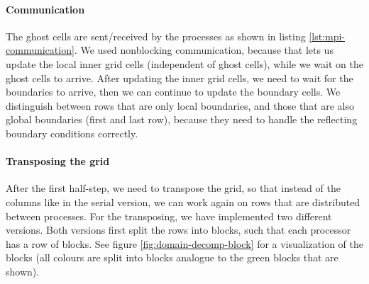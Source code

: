 \documentclass[a4paper]{article}
\begin{document}
\paragraph{Communication}
The ghost cells are sent/received by the processes as shown in listing \ref{lst:mpi-communication}.
We used nonblocking communication, because that lets us update the local inner grid cells (independent of ghost cells), while we wait on the ghost cells to arrive.
After updating the inner grid cells, we need to wait for the boundaries to arrive, then we can continue to update the boundary cells.
We distinguish between rows that are only local boundaries, and those that are also global boundaries (first and last row), because they need to handle the reflecting boundary conditions correctly.

\paragraph{Transposing the grid}
After the first half-step, we need to transpose the grid, so that instead of the columns like in the serial version, we can work again on rows that are distributed between processes.
For the transposing, we have implemented two different versions.
Both versions first split the rows into blocks, such that each processor has a row of blocks.
See figure \ref{fig:domain-decomp-block} for a visualization of the blocks (all colours are split into blocks analogue to the green blocks that are shown).
\end{document}

